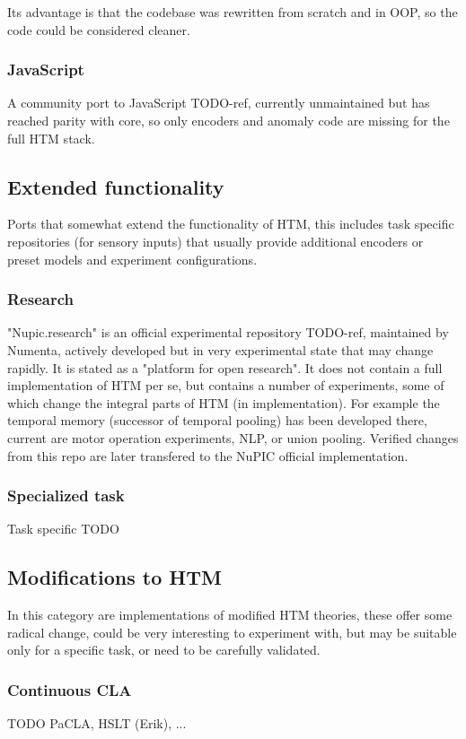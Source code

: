 \documentclass[a4,IEEEconf]{article}
\begin{document}
Its advantage is that the codebase was rewritten from scratch and in OOP, so the code could be considered cleaner. 

\subsubsection{JavaScript}
A community port to JavaScript TODO-ref, currently unmaintained but has reached parity with core, so only encoders and anomaly code are missing for the full HTM stack. 

\subsection{Extended functionality}
Ports that somewhat extend the functionality of HTM, this includes task specific repositories (for sensory inputs) that usually provide additional encoders or preset models and experiment configurations. 

\subsubsection{Research}
"Nupic.research" is an official experimental repository TODO-ref, maintained by Numenta, actively developed but in very experimental state that may change rapidly. It is stated as a "platform for open research". It does not contain a full implementation of HTM per se, but contains a number of experiments, some of which change the integral parts of HTM (in implementation). For example the temporal memory (successor of temporal pooling) has been developed there, current are motor operation experiments, NLP, or union pooling. Verified changes from this repo are later transfered to the NuPIC official implementation. 

\subsubsection{Specialized task}
Task specific TODO
\subsection{Modifications to HTM}
In this category are implementations of modified HTM theories, these offer some radical change, could be very interesting to experiment with, but may be suitable only for a specific task, or need to be carefully validated. 
\subsubsection{Continuous CLA}
TODO
PaCLA, HSLT (Erik), ...
\end{document}
